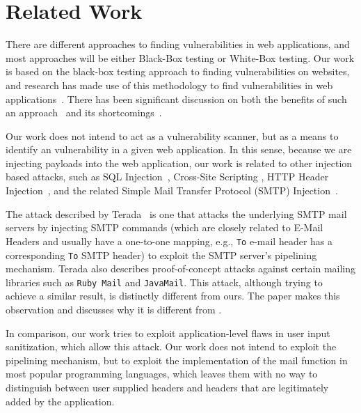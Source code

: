 \section{Related Work}

There are different approaches to finding vulnerabilities in web applications, and most approaches will be either Black-Box testing or White-Box testing.
Our work is based on the black-box testing approach to finding vulnerabilities on websites, and research has made use of this methodology to find vulnerabilities in web applications~\cite{Beizer:1995:BTT:202699, Huang, kals2006secubat, payet13:ears-in-the-wild, zanero2005automatic}. There has been significant discussion on both the benefits of such an approach~\cite{black-box} and its shortcomings~\cite{Doupe2012, Doupe2010}.

Our work does not intend to act as a vulnerability scanner, but as a means to identify an \ehi vulnerability in a given web application. In this sense, because we are injecting payloads into the web application, our work is related to other injection based attacks, such as SQL Injection~\cite{sql1, sql0, sql2}, Cross-Site Scripting \cite{Injection1, KleinAmit}, HTTP Header Injection~\cite{sessionride}, and the related Simple Mail Transfer Protocol (SMTP) Injection~\cite{Terada2015}.

The attack described by Terada~\cite{Terada2015} is one that attacks the underlying SMTP mail servers by injecting SMTP commands (which are closely related to E-Mail Headers and usually have a one-to-one mapping, e.g., \texttt{To} e-mail header has a corresponding \texttt{To} SMTP header) to exploit the SMTP server's pipelining mechanism. Terada also describes proof-of-concept attacks against certain mailing libraries such as \texttt{Ruby Mail} and \texttt{JavaMail}. This attack, although trying to achieve a similar result, is distinctly different from ours. The paper makes this observation and discusses why it is different from \ehi.

In comparison, our work tries to exploit application-level flaws in user input sanitization, which allow this attack. Our work does not intend to exploit the pipelining mechanism, but to exploit the implementation of the mail function in most popular programming languages, which leaves them with no way to distinguish between user supplied headers and headers that are legitimately added by the application.


